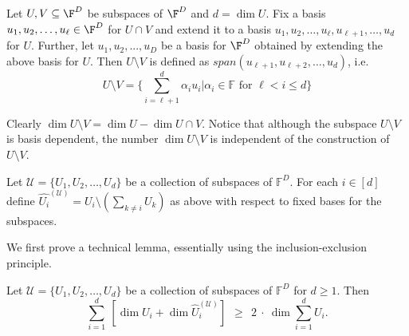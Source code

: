 \begin{definition}\label{def-setminus}
Let $U, V \subseteq \F^D$ be subspaces of $\F^D$ and $d= \dim U$. Fix
a basis $u_1, u_2, \ldots, u_\ell \in \F^D$ for $U \cap V$ and extend
it to a basis $u_1, u_2, \ldots, u_\ell, u_{\ell+1}, \ldots, u_d$ for
$U$. Further, let $u_1, u_2, ..., u_D$ be a basis for $\F^D$ obtained
by extending the above basis for $U$. Then $U\setminus V$ is defined
as $span(u_{\ell+1}, u_{\ell+2}, \ldots, u_d)$, i.e.
\[
U\setminus V = \{ \sum_{i= \ell+1}^{d} \alpha_i u_i | \alpha_i \in \mathbb{F} \textrm{ for } \ell < i \leq d \} 
\]
\end{definition}

Clearly $\dim U\setminus V = \dim U - \dim U \cap V$. Notice that
although the subspace $U\setminus V$ is basis dependent, the number
$\dim U\setminus V$ is independent of the construction of $U\setminus
V$.

\begin{definition}\label{projection}
Let $\mathcal{U}=\{U_1, U_2, \ldots, U_d \}$ be a collection of
subspaces of $\mathbb{F}^{D}$. For each $i \in [d]$ define
$\hat{U_i}^{(\mathcal{U})} = U_i \setminus (\sum_{k \neq i} U_k)$ as
above with respect to fixed bases for the subspaces.
\end{definition}

We first prove a technical lemma, essentially using the
inclusion-exclusion principle.

\begin{lemma}\label{hkv-rank-lemma}
Let $\mathcal{U}= \{U_1, U_2, \ldots, U_d\}$ be a collection of
subspaces of $\mathbb{F}^D$ for $d\geq 1$. Then
\[
\sum_{i=1}^{d}~ \left[\dim U_i + \dim \hat{U}_i^{(\mathcal{U})}
  \right]~~ \geq ~~2~\cdot~\dim \sum_{i=1}^d U_i.
\]
\end{lemma}

